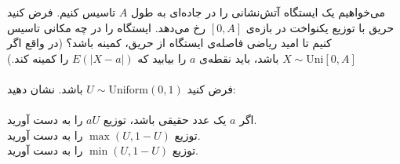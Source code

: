 \problem{}
می‌خواهیم یک ایستگاه آتش‌نشانی را در جاده‌ای به طول \( A \)
 تاسیس کنیم. فرض کنید حریق با توزیع یکنواخت
 در بازه‌ی \([0, A]\) رخ می‌دهد. ایستگاه را در چه مکانی تاسیس کنیم تا
  امید ریاضی فاصله‌ی ایستگاه از حریق، کمینه باشد؟ (در واقع اگر \( X \sim \text{Uni}[0, A] \) باشد،
   باید نقطه‌ی \( a \) را بیابید که \( E(|X - a|) \) را کمینه کند.)
\\
\\
فرض کنید \( U \sim \text{Uniform}(0, 1) \) باشد. نشان دهید:
\\
\\
\subproblem{}
اگر \( a \) یک عدد حقیقی باشد، توزیع \( a U \) را به دست آورید.
\\
\subproblem{}
توزیع \( \max(U, 1 - U) \) را به دست آورید.
\\
\subproblem{}
توزیع \( \min(U, 1 - U) \) را به دست آورید.
